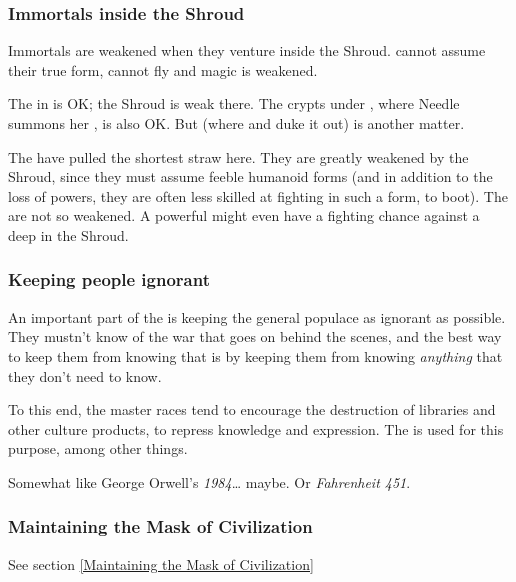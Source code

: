 \subsubsection{Immortals inside the Shroud}
Immortals are weakened when they venture inside the Shroud. 
\Dragons{} cannot assume their true form, \resphain{} cannot fly and magic is weakened. 

The  in \Malcur is OK; the Shroud is weak there.
The crypts under \Malcur, where Needle summons her \banes, is also OK. 
But \Forklin{} (where \Nzessuacrith{} and \Achsah{} duke it out) is another matter. 

The \dragons{} have pulled the shortest straw here. 
They are greatly weakened by the Shroud, since they must assume feeble humanoid forms (and in addition to the loss of powers, they are often less skilled at fighting in such a form, to boot). 
The \resphain{} are not so weakened. 
A powerful \resphan{} might even have a fighting chance against a \dragon{} deep in the Shroud.  









\subsubsection{Keeping people ignorant}
An important part of the \charade{} is keeping the general populace as ignorant as possible. They mustn't know of the war that goes on behind the scenes, and the best way to keep them from knowing that is by keeping them from knowing \emph{anything} that they don't need to know. 

To this end, the master races tend to encourage the destruction of libraries and other culture products, to repress knowledge and expression. The  is used for this purpose, among other things.

Somewhat like George Orwell's \emph{1984}\ldots{} maybe. Or \emph{Fahrenheit 451}. 









\subsubsection{Maintaining the Mask of Civilization}
See section \ref{Maintaining the Mask of Civilization}







